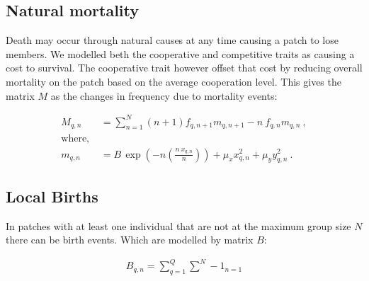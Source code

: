 \subsection{Natural mortality}
Death may occur through natural causes at any time causing a patch to lose members. We modelled beth the cooperative and competitive traits as causing a cost to survival. The cooperative trait however offset that cost by reducing overall mortality on the patch based on the average cooperation level. This gives the matrix $M$ as the changes in frequency due to mortality events:

\begin{align}
    M_{q,n} &= \sum^N_{n=1} (n+1) f_{q, n+1} m_{q, n+1} - n\ f_{q, n} m_{q, n}\ , \\
    \text{where, }&\nonumber\\ 
    m_{q,n} &= B\,\exp\left( -n \left( \frac{n\ x_{q,n}}{n} \right) \right) + \mu_x x_{q,n}^2 + \mu_y y_{q,n}^2\ .
\end{align}

\subsection{Local Births}
In patches with at least one individual that are not at the maximum group size $N$ there can be birth events. Which are modelled by matrix $B$:

\begin{align}
    B_{q,n} = \sum^Q_{q=1} \sum^N-1_{n=1}
\end{align}